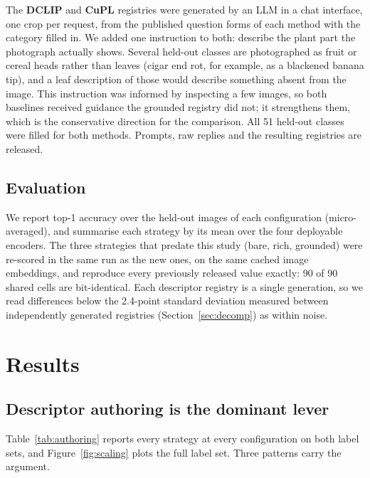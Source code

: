 \documentclass[a4paper,fleqn]{cas-dc}
\begin{document}
The \textbf{DCLIP} and \textbf{CuPL} registries were generated by an LLM in a chat interface, one
crop per request, from the published question forms of each method with the category filled in. We
added one instruction to both: describe the plant part the photograph actually shows. Several
held-out classes are photographed as fruit or cereal heads rather than leaves (cigar end rot, for
example, as a blackened banana tip), and a leaf description of those would describe something absent
from the image. This instruction was informed by inspecting a few images, so both baselines received
guidance the grounded registry did not; it strengthens them, which is the conservative direction for
the comparison. All 51 held-out classes were filled for both methods. Prompts, raw replies and the
resulting registries are released.

\subsection{Evaluation}
\label{sec:eval}

We report top-1 accuracy over the held-out images of each configuration (micro-averaged), and
summarise each strategy by its mean over the four deployable encoders. The three strategies that
predate this study (bare, rich, grounded) were re-scored in the same run as the new ones, on the
same cached image embeddings, and reproduce every previously released value exactly: 90 of 90
shared cells are bit-identical. Each descriptor registry is a single generation, so we read
differences below the 2.4-point standard deviation measured between independently generated
registries (Section~\ref{sec:decomp}) as within noise.

\section{Results}
\label{sec:results}

\subsection{Descriptor authoring is the dominant lever}
\label{sec:lever}

Table~\ref{tab:authoring} reports every strategy at every configuration on both label sets, and
Figure~\ref{fig:scaling} plots the full label set. Three patterns carry the argument.
\end{document}
